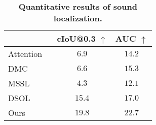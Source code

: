 

\begin{table}[t]
    \caption{\textbf{Quantitative results of sound localization.} }
    \label{tab:stoa_music}
    \centering
    \normalsize
    \begin{tabular}{l cc}
        \toprule\
         & cIoU@0.3 $\uparrow$ & AUC $\uparrow$\\
        \midrule
        Attention ~\cite{av_cvpr18_lls} & $6.9$ & $14.2$ \\
        DMC ~\cite{av_cvpr19_deep_cluster} & $6.6$ & $15.3$ \\
        MSSL ~\cite{av_eccv20_mms_loc} & $4.3$ & $12.1$ \\
        DSOL ~\cite{av_nips20_loc} & $15.4$ & $17.0$  \\
        \midrule
        Ours & $\mathbf{19.8}$ & $\mathbf{22.7}$ \\
        \bottomrule
    \end{tabular}
    \vspace{0mm}
\end{table}





